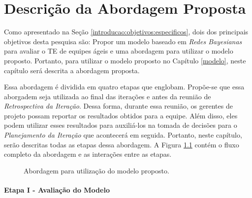 \chapter{Descrição da Abordagem Proposta}
\label{descricao}

Como apresentado na Seção \ref{introducao:objetivos:especificos}, dois dos principais objetivos desta pesquisa são: Propor um modelo baseado em \textit{Redes Bayesianas} para avaliar o TE de equipes ágeis e uma abordagem para utilizar o modelo proposto. Portanto, para utilizar o modelo proposto no Capítulo \ref{modelo}, neste capítulo será descrita a abordagem proposta.

Essa abordagem é dividida em quatro etapas que englobam. Propõe-se que essa aborgadem seja utilizada ao final das iterações e antes da reunião de \textit{Retrospectiva da Iteração}. Dessa forma, durante essa reunião, os gerentes de projeto possam reportar os resultados obtidos para a equipe. Além disso, eles podem utilizar esses resultados para auxiliá-los na tomada de decisões para o \textit{Planejamento da Iteração} que acontecerá em seguida. Portanto, neste capítulo, serão descritas todas as etapas dessa abordagem. A Figura \ref{descricao:etapas} contém o fluxo completo da abordagem e as interações entre as etapas.

\begin{figure}[ht!]
\begin{center}
	\end{center}
	\caption{Abordagem para utilização do modelo proposto.}
	\label{descricao:etapas}
\end{figure}

\subsubsection{Etapa I - Avaliação do Modelo}
\label{descricao:avaliacao}

